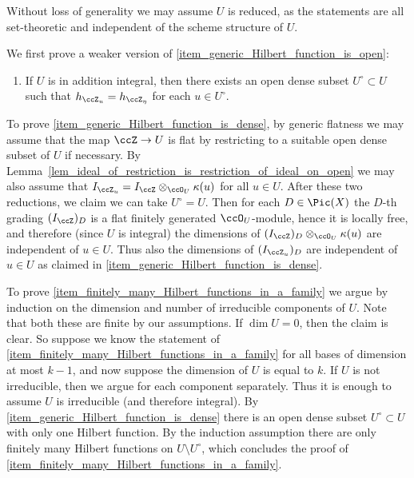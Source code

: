 \documentclass[12pt,a4paper]{article}
\begin{document}
\begin{prf}
   Without loss of generality we may assume $U$ is reduced,
   as the statements are all set-theoretic and independent of the scheme structure of $U$.

   We first prove a weaker version of \ref{item_generic_Hilbert_function_is_open}:
   \renewcommand{\theenumi}{(\roman{enumi}')}
   \begin{enumerate}
    \addtocounter{enumi}{2}
    \item\label{item_generic_Hilbert_function_is_dense}
     If $U$ is in addition integral, then there exists an open dense subset $U^{\circ} \subset U$ such that
     $h_{\ccZ_u} = h_{\ccZ_{\eta}}$ for each $u\in U^{\circ}$.
   \end{enumerate}
   \renewcommand{\theenumi}{(\roman{enumi})}

    To prove \ref{item_generic_Hilbert_function_is_dense}, by generic flatness
    \cite[\href{https://stacks.math.columbia.edu/tag/052A}{Tag 052A}]{stacks_project} we may assume that the map
    $\ccZ\to U$ is flat by restricting to a suitable open dense subset of $U$ if necessary.
    By Lemma~\ref{lem_ideal_of_restriction_is_restriction_of_ideal_on_open}
    we may also assume that
     $I_{\ccZ_{u}} = I_{\ccZ} \otimes_{\ccO_U}\kappa(u)$ for all $u \in U$.
    After these two reductions, we claim we can  take $U^{\circ}=U$.
    Then for each $D\in \Pic(X)$ the $D$-th grading $(I_{\ccZ})_D$ is a flat finitely generated $\ccO_U$-module, hence it is locally free, and therefore (since $U$ is integral) the dimensions of $(I_{\ccZ})_D \otimes_{\ccO_U}\kappa(u)$ are independent of $u\in U$.
    Thus also the dimensions of $(I_{\ccZ_{u}})_D$
    are independent of $u\in U$ as claimed in \ref{item_generic_Hilbert_function_is_dense}.

    To prove \ref{item_finitely_many_Hilbert_functions_in_a_family} we argue by induction on the dimension and number of irreducible components of $U$.
    Note that both these are finite by our assumptions.
    If $\dim U=0$, then the claim is clear.
    So suppose we know the statement of \ref{item_finitely_many_Hilbert_functions_in_a_family} for all bases of dimension at most $k-1$,
    and now suppose the dimension of $U$ is equal to $k$. If $U$ is not irreducible, then we argue for each component separately.
    Thus it is enough to assume $U$ is irreducible (and therefore integral).
    By \ref{item_generic_Hilbert_function_is_dense}
    there is an open dense subset $U^{\circ} \subset U$ with only one Hilbert function.
    By the induction assumption there are only finitely many Hilbert functions on
    $U\setminus U^{\circ}$, which concludes the proof of \ref{item_finitely_many_Hilbert_functions_in_a_family}.



\end{prf}
\end{document}
